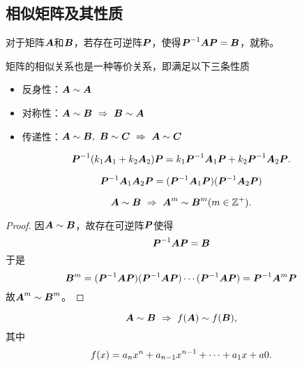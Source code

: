 \subsection{相似矩阵及其性质}

\begin{frame}
  \begin{dingyi}
    对于矩阵$\MA$和$\MB$，若存在可逆阵$\MP$，使得$\MP^{-1}\MA\MP=\MB$，就称。
  \end{dingyi}
  \vspace{.1in} \pause

  矩阵的相似关系也是一种等价关系，即满足以下三条性质
  \begin{itemize}
    \item 反身性：$\MA\sim \MA$
    \item 对称性：$\MA \sim \MB ~\Rightarrow~ \MB \sim \MA$
    \item 传递性：$\MA \sim \MB,~\MB \sim \MC ~\Rightarrow~ \MA \sim \MC$
  \end{itemize}
\end{frame}

\begin{frame}
  \begin{xingzhi}
    $$
    \MP^{-1} (k_1\MA_1+k_2\MA_2)\MP = k_1\MP^{-1}\MA_1\MP + k_2\MP^{-1}\MA_2\MP.
    $$
  \end{xingzhi}

  \begin{xingzhi}
    $$
    \MP^{-1}\MA_1\MA_2\MP = (\MP^{-1}\MA_1\MP)(\MP^{-1}\MA_2\MP)
    $$
  \end{xingzhi}
\end{frame}

\begin{frame}
  \begin{xingzhi}
    $$
    \MA\sim\MB ~\Rightarrow~ \MA^m\sim\MB^m(m\in \mathbb Z^+).
    $$
  \end{xingzhi}\pause \vspace{.1in}

  \begin{proof}
    因$\MA\sim\MB$，故存在可逆阵$\MP$使得
    $$
    \MP^{-1}\MA\MP=\MB
    $$
    于是
    $$
    \MB^m=(\MP^{-1}\MA\MP)(\MP^{-1}\MA\MP)\cd(\MP^{-1}\MA\MP)=\MP^{-1}\MA^m\MP
    $$
    故$\MA^m\sim\MB^m$。
  \end{proof}
\end{frame}

\begin{frame}
  \begin{xingzhi}
    $$
    \MA\sim\MB ~\Rightarrow~ f(\MA)\sim f(\MB),
    $$
    其中
    $$
    f(x) = a_nx^n+a_{n-1}x^{n-1}+\cd+a_1x+a0.
    $$
  \end{xingzhi}
\end{frame}

